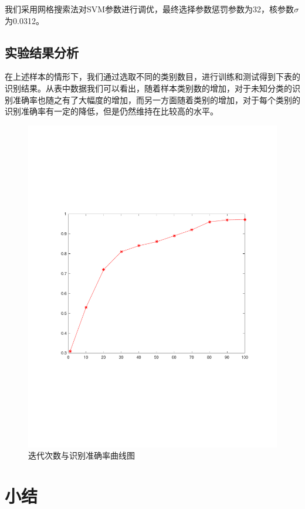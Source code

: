 我们采用网格搜索法对SVM参数进行调优，最终选择参数惩罚参数为32，核参数$\sigma$为0.0312。

\subsection{实验结果分析}

在上述样本的情形下，我们通过选取不同的类别数目，进行训练和测试得到下表的识别结果。从表中数据我们可以看出，随着样本类别数的增加，对于未知分类的识别准确率也随之有了大幅度的增加，而另一方面随着类别的增加，对于每个类别的识别准确率有一定的降低，但是仍然维持在比较高的水平。
\begin{figure}
	\centering
	\includegraphics[width=\textwidth]{figures/diff_epoch.pdf}
	\caption{迭代次数与识别准确率曲线图}
\end{figure}
\section{小结}

